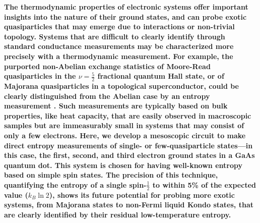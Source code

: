 \documentclass[twocolumn,showpacs,amsmath,amssymb,prl,aps,superscriptaddress]{revtex4-1}
\begin{document}
\maketitle

\textbf{The thermodynamic properties of electronic systems offer important insights into the nature of their ground states, and can probe exotic quasiparticles that may emerge due to interactions or non-trivial topology.  Systems that are difficult to clearly identify through standard conductance measurements may be characterized more precisely with a thermodynamic measurement. For example, the purported non-Abelian exchange statistics of Moore-Read quasiparticles in the $\nu = \frac{5}{2}$ fractional quantum Hall state, or of Majorana quasiparticles in a topological superconductor, could be clearly distinguished from the Abelian case by an entropy measurement \cite{Cooper2009, Ben-Shach2013, Smirnov2015}.  
Such measurements are typically based on bulk properties, like heat capacity, that are easily observed in macroscopic samples but are immeasurably small in systems that may consist of only a few electrons.  Here, we develop a mesoscopic circuit to make direct entropy measurements of single- or few-quasiparticle states---in this case, the first, second, and third electron ground states in a GaAs quantum dot.  This system is chosen for having well-known entropy based on simple spin states\cite{Tarucha1996, Ciorga2000, Duncan2000, Lindemann2002, Potok2003, Hofmann2016}.  The precision of this technique, quantifying the entropy of a single spin-$\frac{1}{2}$ to within 5\% of the expected value ($k_B \ln{2}$), shows its future potential for probing more exotic systems, from Majorana states to non-Fermi liquid Kondo states, that are clearly identified by their residual low-temperature entropy\cite{Alkurtass2016}.}
\end{document}
